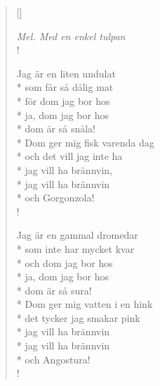 \settowidth{\versewidth}{som får så dålig mat}


\begin{verse}[\versewidth]

\flagverse{}
\emph{Mel. Med en enkel tulpan}\\!

Jag är en liten undulat\\*
som får så dålig mat\\*
för dom jag bor hos\\*
ja, dom jag bor hos\\*
dom är så snåla!\\*
Dom ger mig fisk varenda dag\\*
och det vill jag inte ha\\*
jag vill ha brännvin,\\*
jag vill ha brännvin\\*
och Gorgonzola!\\!


Jag är en gammal dromedar\\*
som inte har mycket kvar\\*
och dom jag bor hos\\*
ja, dom jag bor hos\\*
dom är så sura!\\*
Dom ger mig vatten i en hink\\*
det tycker jag smakar pink\\*
jag vill ha brännvin\\*
jag vill ha brännvin\\*
och Angostura!\\!


\end{verse}

